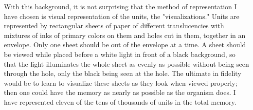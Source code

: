 With this background, it is not surprising that the method of 
representation I have chosen is visual representation of the units, the 
"visualizations." Units are represented by rectangular sheets of paper of 
different translucencies with mixtures of inks of primary colors on them and 
holes cut in them, together in an envelope. Only one sheet should be out of 
the envelope at a time. A sheet should be viewed while placed before a white 
light in front of a black background, so that the light illuminates the whole 
sheet as evenly as possible without being seen through the hole, only the 
black being seen at the hole. The ultimate in fidelity would be to learn to 
visualize these sheets as they look when viewed properly; then one could 
have the memory as nearly as possible as the organism does. I have 
represented eleven of the tens of thousands of units in the total memory. 

